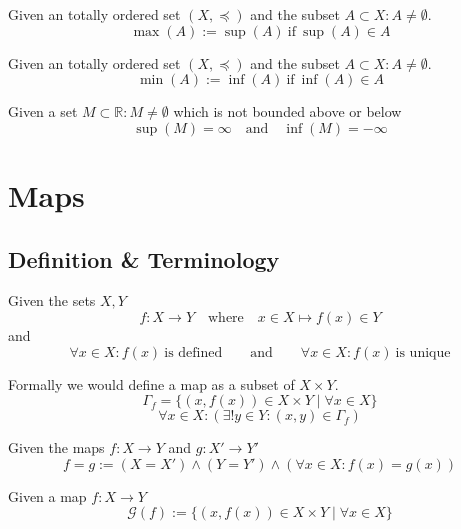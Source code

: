 \begin{definition}[Maximum]
   Given an totally ordered set \((X, \preceq)\) and the subset \(A \subset X: A \neq \emptyset\).
   \[\max(A) := \sup(A)~\text{if}~\sup(A) \in A\]
\end{definition}

\begin{definition}[Minimum]\label{def:set_minimum}
   Given an totally ordered set \((X, \preceq)\) and the subset \(A \subset X: A \neq \emptyset\).
   \[\min(A) := \inf(A)~\text{if}~\inf(A) \in A\]
\end{definition}

\begin{definition}\label{def:unbounded_subsets}
   Given a set \(M \subset \mathbb{R}: M \neq \emptyset\) which is not bounded above or below
   \[\sup(M) = \infty \quad\text{and}\quad \inf(M) = -\infty\]
\end{definition}

\section{Maps}
\subsection{Definition \& Terminology}
\begin{definition}[Map]\label{def:map}
   Given the sets \(X, Y\)
   \[f: X \to Y \quad\text{where}\quad x \in X \mapsto f(x) \in Y\]
   and
   \[\forall x \in X: f(x)~\text{is defined} \qquad\text{and}\qquad \forall x \in X: f(x)~\text{is unique}\]
\end{definition}
\begin{remark}
   Formally we would define a map as a subset of \(X \times Y\).
   \[\Gamma_f = \big\{(x, f(x)) \in X \times Y \mid \forall x \in X\big\}\]
   \[\forall x \in X: (\exists! y \in Y: (x, y) \in \Gamma_f)\]
\end{remark}

\begin{definition}
   Given the maps \(f: X \to Y\) and \(g: X' \to Y'\)
   \[f = g := (X = X') \land (Y = Y') \land (\forall x \in X: f(x) = g(x))\]
\end{definition}

\begin{definition}
   Given a map \(f: X \to Y\)
   \[\mathcal{G}(f) := \big\{(x, f(x)) \in X \times Y \mid \forall x \in X\big\}\]
\end{definition}

